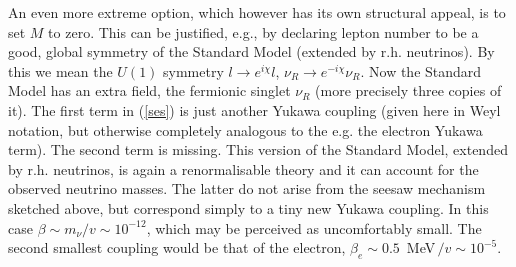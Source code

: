 \documentclass[12pt]{article}
\numberwithin{equation}{section}
\begin{document}
An even more extreme option, which however has its own structural appeal, is to set $M$ to zero. This can be justified, e.g., by declaring lepton number to be a good, global symmetry of the Standard Model (extended by r.h. neutrinos). By this we mean the $U(1)$ symmetry $l\to e^{i\chi}l$, $\nu_R\to e^{-i\chi}\nu_R$. 
Now the Standard Model has an extra field, the fermionic singlet $\nu_R$ (more precisely three copies of it). The first term in (\ref{ses}) is just another Yukawa coupling (given here in Weyl notation, but otherwise completely analogous to the e.g. the electron Yukawa term). The second term is missing. This version of the Standard Model, extended by r.h. neutrinos, is again a renormalisable theory and it can account for the observed neutrino masses. The latter do not arise from the seesaw mechanism sketched above, but correspond simply to a tiny new Yukawa coupling. In this case $\beta\sim m_\nu/v \sim 10^{-12}$, which may be perceived as uncomfortably small. The second smallest coupling would be that of the electron, $\beta_e\sim 0.5$~MeV$\,/v\sim 10^{-5}$.
\end{document}
